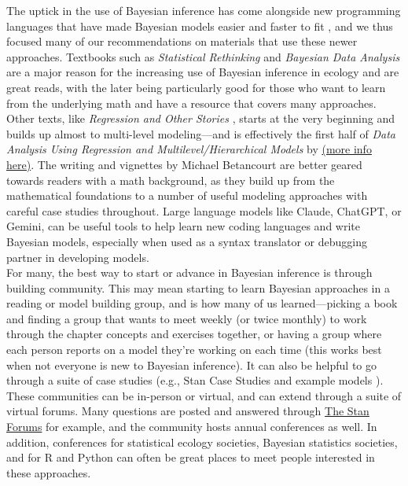 \documentclass{article}
\begin{document}
The uptick in the use of Bayesian inference has come alongside new programming languages that have made Bayesian models easier and faster to fit \citep{Carpenter:2017stan}, and we thus focused many of our recommendations on materials that use these newer approaches. Textbooks such as \emph{Statistical Rethinking} \citep{McElreathSR} and \emph{Bayesian Data Analysis} \citep{GelmanBDA} are a major reason for the increasing use of Bayesian inference in ecology and are great reads, with the later being particularly good for those who want to learn from the underlying math and have a resource that covers many approaches. Other texts, like \emph{Regression and Other Stories} \citep{GelmanROS}, starts at the very beginning and builds up almost to multi-level modeling---and is effectively the first half of \emph{Data Analysis Using Regression and Multilevel/Hierarchical Models} by \cite{GelmanHill2007} \href{http://www.stat.columbia.edu/~gelman/arm/}{(more info here)}. The writing and vignettes by Michael Betancourt are better geared towards readers with a math background, as they build up from the mathematical foundations to a number of useful modeling approaches with careful case studies throughout. Large language models like Claude, ChatGPT, or Gemini, can be useful tools to help learn new coding languages and write Bayesian models, especially when used as a syntax translator or debugging partner in developing models.\\

For many, the best way to start or advance in Bayesian inference is through building community. This may mean starting to learn Bayesian approaches in a reading or model building group, and is how many of us learned---picking a book and finding a group that wants to meet weekly (or twice monthly) to work through the chapter concepts and exercises together, or having a group where each person reports on a model they're working on each time (this works best when not everyone is new to Bayesian inference). It can also be helpful to go through a suite of case studies (e.g., Stan Case Studies \citep{stanCaseStudies} and example models \cite{stanExampleModels}). These communities can be in-person or virtual, and can extend through a suite of virtual forums. Many questions are posted and answered through \href{https://discourse.mc-stan.org/}{The Stan Forums} \citep{stanForum} for example, and the community hosts annual conferences as well. In addition, conferences for statistical ecology societies, Bayesian statistics societies, and for R and Python can often be great places to meet people interested in these approaches.
\end{document}
